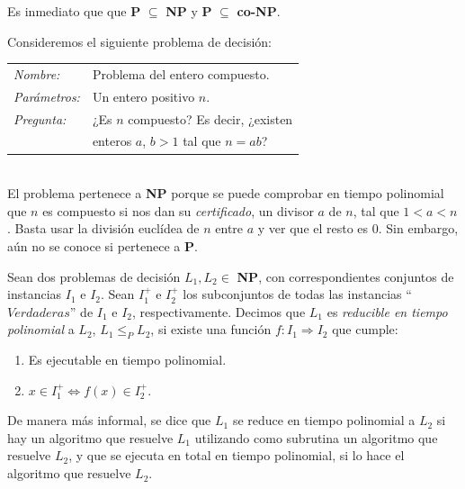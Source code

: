 Es inmediato que  que \textbf{P} $\subseteq$ \textbf{NP} y \textbf{P} $\subseteq$ \textbf{co-NP}.

\begin{example}
	Consideremos el siguiente problema de decisión:

	\begin{tabular}{|ll}
		\textit{Nombre:} & Problema del entero compuesto. \\
		\textit{Parámetros:} & Un entero positivo $n$. \\
		\textit{Pregunta:} & ¿Es $n$ compuesto? Es decir, ¿existen \\
		&  enteros $a$, $b > 1$ tal que $n=ab$? \\
	\end{tabular}
	\\

	El problema pertenece a \textbf{NP} porque se puede comprobar en tiempo polinomial que
	$n$ es compuesto si nos dan su \textit{certificado}, un divisor $a$ de $n$, tal que $1 < a < n$.
	Basta usar la división euclídea de $n$ entre $a$ y ver que el resto es $0$. Sin embargo,
	aún no se conoce si pertenece a \textbf{P}.
\end{example}


\hfil

\begin{definition}
	\label{reducePoly:def}
	Sean dos problemas de decisión $L_1, L_2 \in $ \textbf{NP}, con correspondientes
	conjuntos de instancias $I_1$ e $I_2$. Sean $I_1^+$ e $I_2^+$ los subconjuntos
	de todas las instancias ``$Verdaderas$'' de $I_1$ e $I_2$, respectivamente.
	Decimos que $L_1$ es \textit{reducible en tiempo polinomial} a $L_2$, $L_1
	\leq_P L_2$, si existe una función $f:I_1 \Rightarrow I_2$ que cumple:

	\begin{enumerate}
		\item Es ejecutable en tiempo polinomial.
		\item $x \in I_1^+  \Leftrightarrow  f(x) \in I_2^+ $.
	\end{enumerate}
\end{definition}

\hfil

De manera más informal, se dice que $L_1$ se reduce en tiempo polinomial a
$L_2$ si hay un algoritmo que resuelve $L_1$ utilizando como subrutina un
algoritmo que resuelve $L_2$, y que se ejecuta en total en tiempo polinomial,
si lo hace el algoritmo que resuelve $L_2$.


